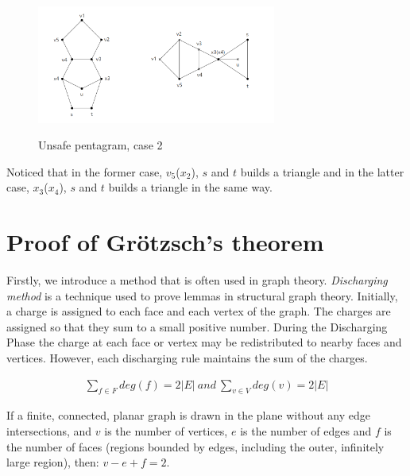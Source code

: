 \begin{figure}[H] %
\centering %
\includegraphics[width=0.7\textwidth]{figure/unsafepentagram2.png} 
\label{figure} %
\caption{Unsafe pentagram, case 2}
\end{figure}
Noticed that in the former case, $v_5$($x_2$), $s$ and $t$ builds a triangle and in the latter case, $x_3$($x_4$), $s$ and $t$ builds a triangle in the same way.

\section{Proof of Grötzsch's theorem}
Firstly, we introduce a method that is often used in graph theory. 
\textit{Discharging method} is a technique used to prove lemmas in structural graph theory. Initially, a charge is assigned to each face and each vertex of the graph. The charges are assigned so that they sum to a small positive number. During the Discharging Phase the charge at each face or vertex may be redistributed to nearby faces and vertices. However, each discharging rule maintains the sum of the charges.\cite{discharging}

\begin{observation}
\begin{align*}
    \sum_{f \in F}deg(f) = 2|E| \ and \ \sum_{v \in V}deg(v) = 2|E|
\end{align*}
\end{observation}

\begin{theorem}
If a finite, connected, planar graph is drawn in the plane without any edge intersections, and $v$ is the number of vertices, $e$ is the number of edges and $f$ is the number of faces (regions bounded by edges, including the outer, infinitely large region), then: $v-e+f=2$. \cite{euler}
\end{theorem}

